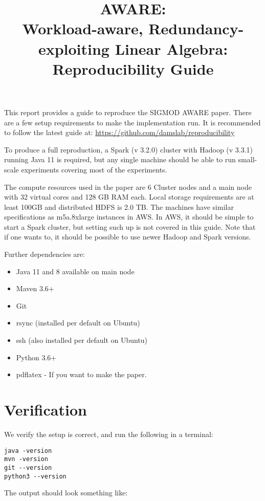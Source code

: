 \documentclass{readme}
\title{AWARE: \\ Workload-aware, Redundancy-exploiting Linear Algebra: \\ Reproducibility Guide}
\begin{document}
\maketitle

This report provides a guide to reproduce the SIGMOD AWARE paper.
There are a few setup requirements to make the implementation run.
It is recommended to follow the latest guide at:
\url{https://github.com/damslab/reproducibility}

To produce a full reproduction, a Spark (v 3.2.0) cluster with Hadoop (v 3.3.1) running Java 11 is required, but any single machine should be able to run small-scale experiments covering most of the experiments.

The compute resources used in the paper are 6 Cluster nodes and a main node with 32 virtual cores and 128 GB RAM each. Local storage requirements are at least 100GB and distributed HDFS is 2.0 TB.
The machines have similar specifications as m5a.8xlarge instances in AWS. In AWS, it should be simple to start a Spark cluster, but setting such up is not covered in this guide.
Note that if one wants to, it should be possible to use newer Hadoop and Spark versions.

Further dependencies are:

\begin{itemize}
    \item Java 11 and 8 available on main node
    \item Maven 3.6+
    \item Git
    \item rsync (installed per default on Ubuntu)
    \item ssh (also installed per default on Ubuntu)
    \item Python 3.6+
    \item pdflatex - If you want to make the paper.
\end{itemize}

\section{Verification}

We verify the setup is correct, and run the following in a terminal:

\begin{lstlisting}
java -version
mvn -version
git --version
python3 --version
\end{lstlisting}

\noindent
The output should look something like:
\end{document}
